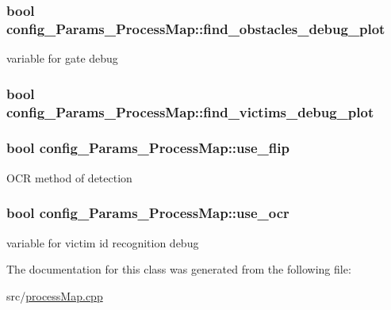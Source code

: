 \subsubsection[{\texorpdfstring{find\+\_\+obstacles\+\_\+debug\+\_\+plot}{find_obstacles_debug_plot}}]{\setlength{\rightskip}{0pt plus 5cm}bool config\+\_\+\+Params\+\_\+\+Process\+Map\+::find\+\_\+obstacles\+\_\+debug\+\_\+plot}\hypertarget{classconfig__Params__ProcessMap_a4fd3039d8067dccf1049f5059da136b8}{}\label{classconfig__Params__ProcessMap_a4fd3039d8067dccf1049f5059da136b8}
variable for gate debug 
\subsubsection[{\texorpdfstring{find\+\_\+victims\+\_\+debug\+\_\+plot}{find_victims_debug_plot}}]{\setlength{\rightskip}{0pt plus 5cm}bool config\+\_\+\+Params\+\_\+\+Process\+Map\+::find\+\_\+victims\+\_\+debug\+\_\+plot}\hypertarget{classconfig__Params__ProcessMap_ae591827a509aec2c225311dff3745500}{}\label{classconfig__Params__ProcessMap_ae591827a509aec2c225311dff3745500}
\subsubsection[{\texorpdfstring{use\+\_\+flip}{use_flip}}]{\setlength{\rightskip}{0pt plus 5cm}bool config\+\_\+\+Params\+\_\+\+Process\+Map\+::use\+\_\+flip}\hypertarget{classconfig__Params__ProcessMap_a5bcffdee06a89ee4157bcd524d70b1eb}{}\label{classconfig__Params__ProcessMap_a5bcffdee06a89ee4157bcd524d70b1eb}
O\+CR method of detection 
\subsubsection[{\texorpdfstring{use\+\_\+ocr}{use_ocr}}]{\setlength{\rightskip}{0pt plus 5cm}bool config\+\_\+\+Params\+\_\+\+Process\+Map\+::use\+\_\+ocr}\hypertarget{classconfig__Params__ProcessMap_a33441b8db8108220849c6b84381a99f7}{}\label{classconfig__Params__ProcessMap_a33441b8db8108220849c6b84381a99f7}
variable for victim id recognition debug 

The documentation for this class was generated from the following file\+:\begin{DoxyCompactItemize}
\item 
src/\hyperlink{processMap_8cpp}{process\+Map.\+cpp}\end{DoxyCompactItemize}
